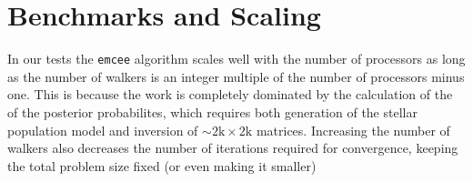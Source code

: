 \documentclass{article}
\begin{document}
\section{Benchmarks and Scaling}
In our tests the \texttt{emcee} algorithm scales well with the number of processors as long as the number of walkers is an integer multiple of the number of processors minus one.  This is because the work is completely dominated by the calculation of the of the posterior probabilites, which requires both generation of the stellar population model and inversion of $\sim 2\mbox{k} \times 2\mbox{k}$ matrices.  Increasing the number of walkers also decreases the number of iterations required for convergence, keeping the total problem size fixed (or even making it smaller)
\end{document}
